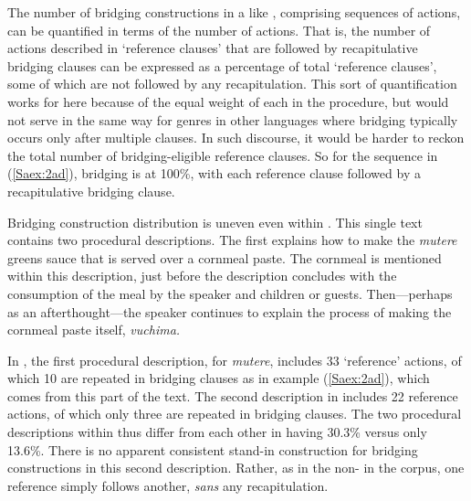 \documentclass[output=paper]{LSP/langsci}
\begin{document}
The number of bridging constructions in a  like \citet{Chesi2014}, comprising sequences of actions, can be quantified in terms of the number of actions. That is, the number of actions described in `reference clauses' that are followed by recapitulative bridging clauses can be expressed as a percentage of total `reference clauses', some of which are not followed by any recapitulation. This sort of quantification works for  here because of the equal weight of each  in the procedure, but would not serve in the same way for genres in other languages where bridging typically occurs only after multiple clauses. In such discourse, it would be harder to reckon the total number of bridging-eligible reference clauses. So for the sequence in (\ref{Saex:2ad}), bridging is at 100\%, with each reference clause followed by a recapitulative bridging clause.

Bridging construction distribution is uneven even within \citet{Chesi2014}. This single text contains two procedural descriptions. The first explains how to make the \textit{mutere} greens sauce that is served over a cornmeal paste. The cornmeal is mentioned within this description, just before the description concludes with the consumption of the meal by the speaker and children or guests. Then—perhaps as an afterthought—the speaker continues to explain the process of making the cornmeal paste itself, \textit{vuchima.} 

In \citet{Chesi2014}, the first procedural description, for \textit{mutere}, includes 33 `reference' actions, of which 10 are repeated in bridging clauses as in example (\ref{Saex:2ad}), which comes from this part of the text. The second description in \citet{Chesi2014} includes 22 reference actions, of which only three are repeated in bridging clauses. The two procedural descriptions within \citet{Chesi2014} thus differ from each other in having 30.3\%  versus only 13.6\%. There is no apparent consistent stand-in construction for bridging constructions in this second description. Rather, as in the non- in the corpus, one reference  simply follows another, \textit{sans} any recapitulation.
\end{document}
